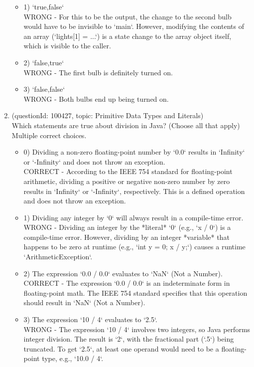 \documentclass[12pt]{article}
\begin{document}
\begin{enumerate}[label=(\arabic*)]
\begin{itemize}
\item 1) `true,false`
 \\ 
WRONG - For this to be the output, the change to the second bulb would have to be invisible to `main`. However, modifying the contents of an array (`lights[1] = ...`) is a state change to the array object itself, which is visible to the caller.

\item 2) `false,true`
 \\ 
WRONG - The first bulb is definitely turned on.

\item 3) `false,false`
 \\ 
WRONG - Both bulbs end up being turned on.

\end{itemize}
\item (questionId: 100427, topic: Primitive Data Types and Literals) \\ 
Which statements are true about division in Java? (Choose all that apply)
\\ \noindent Multiple correct choices. 
\begin{itemize}
\item 0) Dividing a non-zero floating-point number by `0.0` results in `Infinity` or `-Infinity` and does not throw an exception.
 \\ 
CORRECT - According to the IEEE 754 standard for floating-point arithmetic, dividing a positive or negative non-zero number by zero results in `Infinity` or `-Infinity`, respectively. This is a defined operation and does not throw an exception.

\item 1) Dividing any integer by `0` will always result in a compile-time error.
 \\ 
WRONG - Dividing an integer by the *literal* `0` (e.g., `x / 0`) is a compile-time error. However, dividing by an integer *variable* that happens to be zero at runtime (e.g., `int y = 0; x / y;`) causes a runtime `ArithmeticException`.

\item 2) The expression `0.0 / 0.0` evaluates to `NaN` (Not a Number).
 \\ 
CORRECT - The expression `0.0 / 0.0` is an indeterminate form in floating-point math. The IEEE 754 standard specifies that this operation should result in `NaN` (Not a Number).

\item 3) The expression `10 / 4` evaluates to `2.5`.
 \\ 
WRONG - The expression `10 / 4` involves two integers, so Java performs integer division. The result is `2`, with the fractional part (`.5`) being truncated. To get `2.5`, at least one operand would need to be a floating-point type, e.g., `10.0 / 4`.


\end{itemize}
\end{enumerate}
\end{document}
